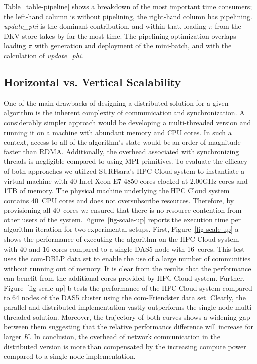 Table~\ref{table-pipeline} shows a breakdown of the most important time
consumers; the left-hand column is without pipelining, the right-hand
column has pipelining. \textit{update\_phi} is the dominant contribution,
and within that, loading $\pi$ from the DKV store takes by far the most time.
The pipelining optimization overlaps loading $\pi$ with generation and
deployment of the mini-batch, and with the calculation of \textit{update\_phi}.

\subsection{Horizontal vs. Vertical Scalability}
\begin{figure*}[t] %
  \centering
  \caption{Performance comparison between the distributed implementation
  running on DAS5 and the multi-threaded solution on machine with 40-cores and
  1TB of RAM.}
  \label{fig-scale-up}
\end{figure*}
One of the main drawbacks of designing a distributed solution for a given
algorithm is the inherent complexity of communication and synchronization. A
considerably simpler approach would be developing a multi-threaded version and
running it on a machine with abundant memory and CPU cores. In such a context,
access to all of the algorithm's state would be an order of magnitude faster
than RDMA. Additionally, the overhead associated with synchronizing threads is
negligible compared to using MPI primitives. To evaluate the efficacy of both
approaches we utilized SURFsara's HPC Cloud system to instantiate a virtual
machine with 40 Intel Xeon E7-4850 cores clocked at 2.00GHz cores and 1TB of
memory. The physical machine underlying
the HPC Cloud system contains 40~CPU cores and does not oversubscribe
resources. Therefore, by provisioning all 40~cores we ensured that there is no
resource contention from other users of the system. Figure~\ref{fig-scale-up}
reports the execution time per algorithm iteration for two experimental setups.
%
First, Figure~\ref{fig-scale-up}-a shows the performance of executing the
algorithm on the HPC Cloud
system with 40 and 16 cores compared to a single DAS5 node with 16~cores. This
test uses the com-DBLP data set to enable the use of a large number of
communities without running out of memory. It is clear from the results that
the performance can benefit from the additional cores provided by HPC Cloud system.
%
Further, Figure~\ref{fig-scale-up}-b tests the performance of the HPC Cloud
system compared to 64 nodes of the DAS5
cluster using the com-Friendster data set. Clearly, the parallel and
distributed implementation vastly
outperforms the single-node multi-threaded solution. Moreover, the trajectory
of both curves shows a widening gap between them suggesting that the relative
performance difference will increase for larger $K$.
%
In conclusion, the overhead of network communication in the distributed version
is more than compensated by the increasing compute power compared to
a single-node implementation.

